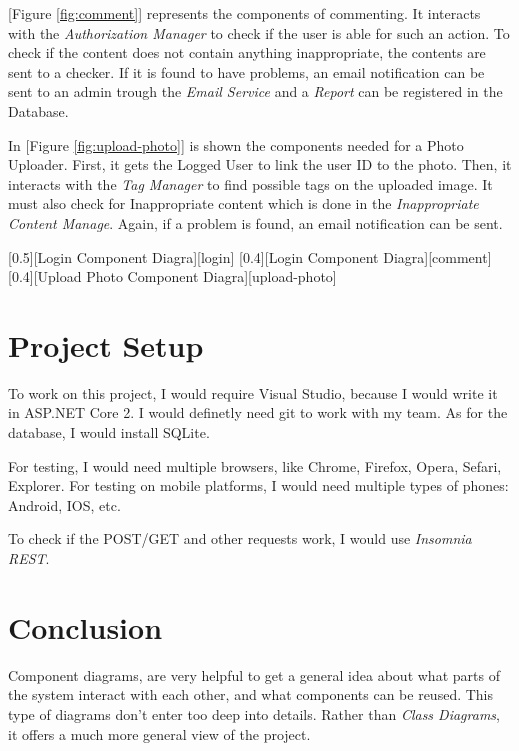\documentclass{article}
\begin{document}
		\bigskip
		[Figure \ref{fig:comment}] represents the components of commenting. It interacts with the \textit{Authorization Manager} to check if the user is able for such an action. To check if the content does not contain anything inappropriate, the contents are sent to a checker. If it is found to have problems, an email notification can be sent to an admin trough the \textit{Email Service} and a \textit{Report} can be registered in the Database.

		\bigskip
		In [Figure \ref{fig:upload-photo}] is shown the components needed for a Photo Uploader. First, it gets the Logged User to link the user ID to the photo. Then, it interacts with the \textit{Tag Manager} to find possible tags on the uploaded image. It must also check for Inappropriate content which is done in the \textit{Inappropriate Content Manage}. Again, if a problem is found, an email notification can be sent.

		[0.5][Login Component Diagra][login]
		[0.4][Login Component Diagra][comment]
		[0.4][Upload Photo Component Diagra][upload-photo]

	\section{Project Setup}
		To work on this project, I would require Visual Studio, because I would write it in ASP.NET Core 2. I would definetly need git to work with my team. As for the database, I would install SQLite.

		For testing, I would need multiple browsers, like Chrome, Firefox, Opera, Sefari, Explorer. For testing on mobile platforms, I would need multiple types of phones: Android, IOS, etc.

		To check if the POST/GET and other requests work, I would use \textit{Insomnia REST}.

	\section{Conclusion}
		Component diagrams, are very helpful to get a general idea about what parts of the system interact with each other, and what components can be reused. This type of diagrams don't enter too deep into details. Rather than \textit{Class Diagrams}, it offers a much more general view of the project.
\end{document}
